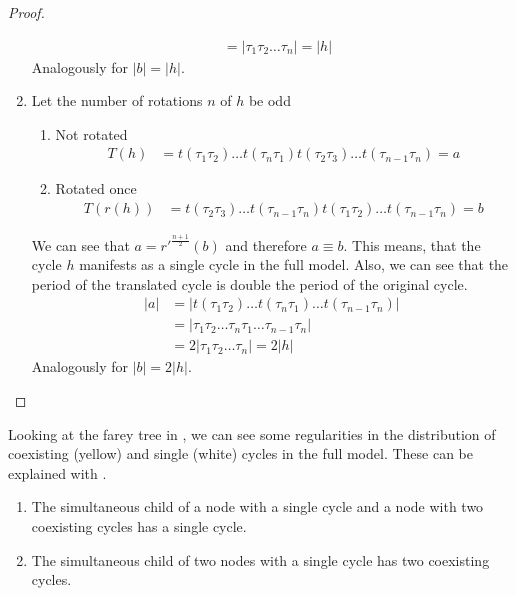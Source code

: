 \begin{proof}
\begin{enumerate}
\begin{align*}
			          & = |\tau_1\tau_2 \dots \tau_n| = |h|
		      \end{align*}
		      Analogously for $|b| = |h|$.
		\item Let the number of rotations $n$ of $h$ be odd
		      \begin{enumerate}[label=\alph*)]
			      \item Not rotated
			            \begin{align*}
				            T(h) & = t(\tau_1\tau_2) \dots t(\tau_{n}\tau_1) t(\tau_2\tau_3) \dots t(\tau_{n-1}\tau_n) = a
			            \end{align*}
			      \item Rotated once
			            \begin{align*}
				            T(r(h)) & = t(\tau_2\tau_3) \dots t(\tau_{n-1}\tau_n) t(\tau_1\tau_2) \dots t(\tau_{n-1}\tau_n) = b
			            \end{align*}
		      \end{enumerate}
		      We can see that $a = r'^{\frac{n+1}{2}}(b)$ and therefore $a \equiv b$.
		      This means, that the cycle $h$ manifests as a single cycle in the full model.
		      Also, we can see that the period of the translated cycle is double the period of the original cycle.
		      \begin{align*}
			      |a| & = |t(\tau_1\tau_2) \dots t(\tau_n\tau_1) \dots t(\tau_{n-1}\tau_n)| \\
			          & = |\tau_1\tau_2 \dots \tau_n\tau_1 \dots \tau_{n-1}\tau_n|          \\
			          & = 2 |\tau_1\tau_2 \dots \tau_n| = 2 |h|
		      \end{align*}
		      Analogously for $|b| = 2 |h|$.
	\end{enumerate}
\end{proof}

Looking at the farey tree in , we can see some regularities in the distribution of coexisting (yellow) and single (white) cycles in the full model.
These can be explained with .

\begin{theorem}
	\begin{enumerate}
		\item The simultaneous child of a node with a single cycle and a node with two coexisting cycles has a single cycle.
		\item The simultaneous child of two nodes with a single cycle has two coexisting cycles.
	\end{enumerate}
\end{theorem}

